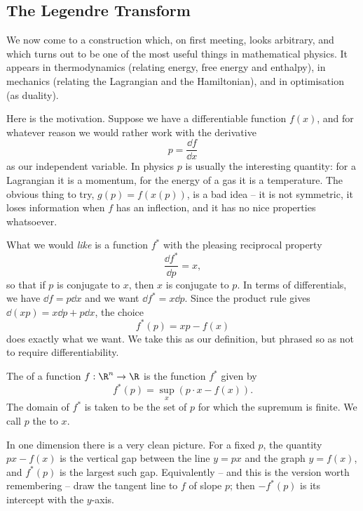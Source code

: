 \subsection{The Legendre Transform}

We now come to a construction which, on first meeting, looks arbitrary, and which turns out to be one of the most useful things in mathematical physics. It appears in thermodynamics (relating energy, free energy and enthalpy), in mechanics (relating the Lagrangian and the Hamiltonian), and in optimisation (as duality).

Here is the motivation. Suppose we have a differentiable function $f(x)$, and for whatever reason we would rather work with the derivative
$$
p = \frac{\dd f}{\dd x}
$$
as our independent variable. In physics $p$ is usually the interesting quantity: for a Lagrangian it is a momentum, for the energy of a gas it is a temperature. The obvious thing to try, $g(p) = f(x(p))$, is a bad idea -- it is not symmetric, it loses information when $f$ has an inflection, and it has no nice properties whatsoever.

What we would \emph{like} is a function $f^*$ with the pleasing reciprocal property
$$
\frac{\dd f^*}{\dd p} = x,
$$
so that if $p$ is conjugate to $x$, then $x$ is conjugate to $p$. In terms of differentials, we have $\dd f = p \dd x$ and we want $\dd f^* = x \dd p$. Since the product rule gives $\dd(xp) = x \dd p + p \dd x$, the choice
$$
f^*(p) = xp - f(x)
$$
does exactly what we want. We take this as our definition, but phrased so as not to require differentiability.

\begin{definition}
	The  of a function $f: \R^n \rightarrow \R$ is the function $f^*$ given by
	$$
	f^*(p) = \sup_x \left(p \cdot x - f(x)\right).
	$$
	The domain of $f^*$ is taken to be the set of $p$ for which the supremum is finite. We call $p$ the  to $x$.
\end{definition}

In one dimension there is a very clean picture. For a fixed $p$, the quantity $px - f(x)$ is the vertical gap between the line $y = px$ and the graph $y = f(x)$, and $f^*(p)$ is the largest such gap. Equivalently -- and this is the version worth remembering -- draw the tangent line to $f$ of slope $p$; then $-f^*(p)$ is its intercept with the $y$-axis.

